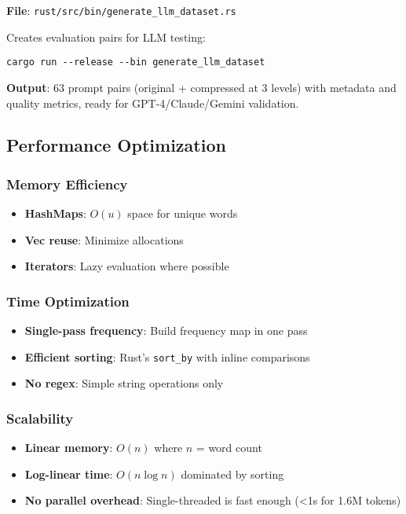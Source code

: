 \textbf{File}: \texttt{rust/src/bin/generate\_llm\_dataset.rs}

Creates evaluation pairs for LLM testing:

\begin{verbatim}
cargo run --release --bin generate_llm_dataset
\end{verbatim}

\textbf{Output}: 63 prompt pairs (original + compressed at 3 levels) with metadata and quality metrics, ready for GPT-4/Claude/Gemini validation.

\subsection{Performance Optimization}

\subsubsection{Memory Efficiency}

\begin{itemize}
    \item \textbf{HashMaps}: $O(u)$ space for unique words
    \item \textbf{Vec reuse}: Minimize allocations
    \item \textbf{Iterators}: Lazy evaluation where possible
\end{itemize}

\subsubsection{Time Optimization}

\begin{itemize}
    \item \textbf{Single-pass frequency}: Build frequency map in one pass
    \item \textbf{Efficient sorting}: Rust's \texttt{sort\_by} with inline comparisons
    \item \textbf{No regex}: Simple string operations only
\end{itemize}

\subsubsection{Scalability}

\begin{itemize}
    \item \textbf{Linear memory}: $O(n)$ where $n$ = word count
    \item \textbf{Log-linear time}: $O(n \log n)$ dominated by sorting
    \item \textbf{No parallel overhead}: Single-threaded is fast enough (<1s for 1.6M tokens)
\end{itemize}

